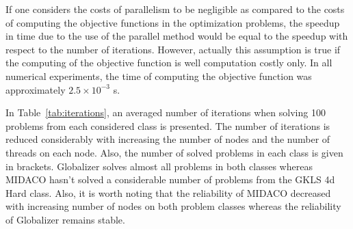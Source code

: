\documentclass{svproc}
\begin{document}
If one considers the costs of parallelism to be negligible as compared to the costs of computing the
objective functions in the optimization problems, the speedup in time due to the use of the parallel
method would be equal to the speedup with respect to the number of iterations. However, actually
this assumption is true if the computing of the objective function is well computation costly only. In
all numerical experiments, the time of computing the objective function was approximately $2.5\times
10^{-3}$ s.

In Table~\ref{tab:iterations}, an averaged number of iterations when solving 100 problems from
each considered class is presented.
The number of iterations is reduced considerably with increasing the number of nodes and the
number of threads on each node. Also, the number of solved problems in each class is given  in
brackets.
Globalizer solves almost all problems in both classes whereas MIDACO hasn't solved a considerable
number of problems from the GKLS 4d Hard class. Also, it is worth noting that the reliability of
MIDACO decreased with increasing number of nodes on both problem classes whereas the
reliability of Globalizer remains stable.
\end{document}
